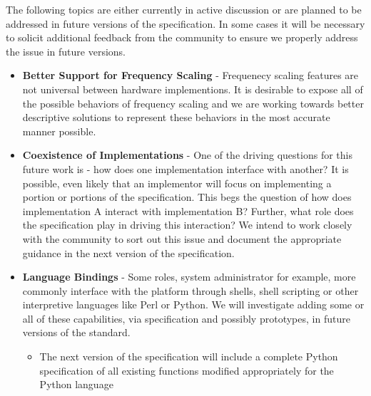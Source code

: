 

The following topics are either currently in active discussion or are planned to be addressed in future versions of the specification.
In some cases it will be necessary to solicit additional feedback from the community to ensure we properly address the issue in future versions.

\begin{itemize}[noitemsep,nolistsep]

\item{\textbf{Better Support for Frequency Scaling} - Frequenecy scaling features are not universal between hardware implementions. It is desirable to expose all of the possible behaviors of frequency scaling and we are working towards better descriptive solutions to represent these behaviors in the most accurate manner possible.}

\item{\textbf{Coexistence of Implementations} - One of the driving questions for this future work is - how does one implementation interface with another? It is possible, even likely that an implementor will focus on implementing a portion or portions of the specification. This begs the question of how does implementation A interact with implementation B? Further, what role does the specification play in driving this interaction? We intend to work closely with the community to sort out this issue and document the appropriate guidance in the next version of the specification.
}
\item{\textbf{Language Bindings} - Some roles, system administrator for example, more commonly interface with the platform through shells, shell scripting or other interpretive languages like Perl or Python. We will investigate adding some or all of these capabilities, via specification and possibly prototypes, in future versions of the standard.
}
    \begin{itemize}
        \item{The next version of the specification will include a complete Python specification of all existing functions modified appropriately for the Python language}
    \end{itemize}


\end{itemize}
